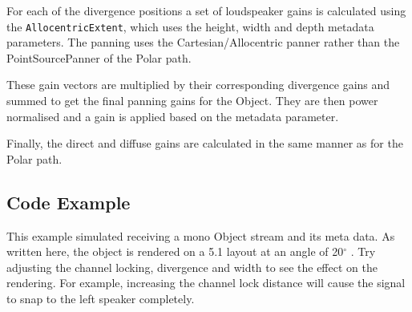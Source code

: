 \documentclass[12pt]{report}
\def\deg{$^{\circ}$ }
\newcommand{\code}[1]{\texttt{#1}}
\begin{document}
For each of the divergence positions a set of loudspeaker gains is calculated using the \code{AllocentricExtent}, which uses the height, width and depth metadata parameters.
The panning uses the Cartesian/Allocentric panner rather than the PointSourcePanner of the Polar path.

These gain vectors are multiplied by their corresponding divergence gains and summed to get the final panning gains for the Object.
They are then power normalised and a gain is applied based on the metadata parameter.

Finally, the direct and diffuse gains are calculated in the same manner as for the Polar path.

\subsection{Code Example}

This example simulated receiving a mono Object stream and its meta data.
As written here, the object is rendered on a 5.1 layout at an angle of 20\deg. Try adjusting the channel locking, divergence and width to see the effect on the rendering.
For example, increasing the channel lock distance will cause the signal to snap to the left speaker completely.
\end{document}
